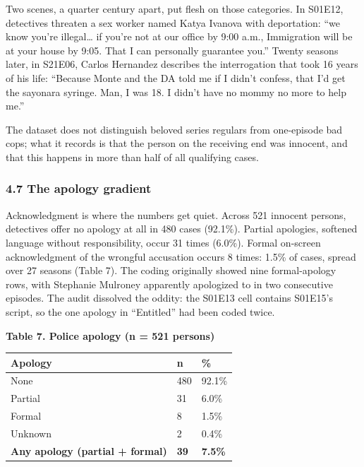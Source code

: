 \documentclass[
]{article}
\newcounter{none} %
\begin{document}
Two scenes, a quarter century apart, put flesh on those categories. In
S01E12, detectives threaten a sex worker named Katya Ivanova with
deportation: ``we know you're illegal\ldots{} if you're not at our
office by 9:00 a.m., Immigration will be at your house by 9:05. That I
can personally guarantee you.'' Twenty seasons later, in S21E06, Carlos
Hernandez describes the interrogation that took 16 years of his life:
``Because Monte and the DA told me if I didn't confess, that I'd get the
sayonara syringe. Man, I was 18. I didn't have no mommy no more to help
me.''

The dataset does not distinguish beloved series regulars from
one-episode bad cops; what it records is that the person on the
receiving end was innocent, and that this happens in more than half of
all qualifying cases.

\subsubsection{4.7 The apology gradient}\label{the-apology-gradient}

Acknowledgment is where the numbers get quiet. Across 521 innocent
persons, detectives offer no apology at all in 480 cases (92.1\%).
Partial apologies, softened language without responsibility, occur 31
times (6.0\%). Formal on-screen acknowledgment of the wrongful
accusation occurs 8 times: 1.5\% of cases, spread over 27 seasons (Table
7). The coding originally showed nine formal-apology rows, with
Stephanie Mulroney apparently apologized to in two consecutive episodes.
The audit dissolved the oddity: the S01E13 cell contains S01E15's
script, so the one apology in ``Entitled'' had been coded twice.

\textbf{Table 7. Police apology (n = 521 persons)}

{\def\LTcaptype{none} %
\begin{longtable}[]{@{}lll@{}}
\toprule\noalign{}
Apology & n & \% \\
\midrule\noalign{}
\endhead
\bottomrule\noalign{}
\endlastfoot
None & 480 & 92.1\% \\
Partial & 31 & 6.0\% \\
Formal & 8 & 1.5\% \\
Unknown & 2 & 0.4\% \\
\textbf{Any apology (partial + formal)} & \textbf{39} &
\textbf{7.5\%} \\
\end{longtable}
}
\end{document}
